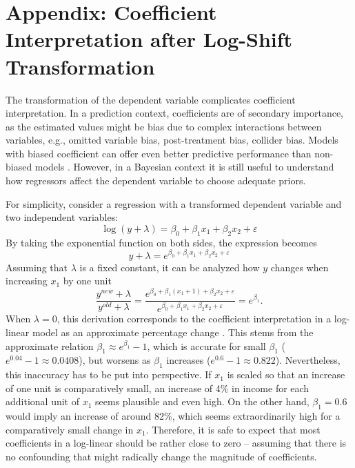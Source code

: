 \chapter{Appendix: Coefficient Interpretation after Log-Shift Transformation}
\label{appendix:coeff}
The transformation of the dependent variable complicates coefficient interpretation.
In a prediction context, coefficients are of secondary importance, as the estimated values might be bias due to complex interactions between variables, e.g., omitted variable bias, post-treatment bias, collider bias.
Models with biased coefficient can offer even better predictive performance than non-biased models \citep[Chapter 7]{mcelreath_statistical_2020}.
However, in a Bayesian context it is still useful to understand how regressors affect the dependent variable to choose adequate priors.

For simplicity, consider a regression with a transformed dependent variable and two independent variables:
\begin{equation*}
    \log(y + \lambda) = \beta_0 + \beta_1 x_1 + \beta_2 x_2 + \varepsilon
\end{equation*}
By taking the exponential function on both sides, the expression becomes
\begin{equation*}
    y + \lambda = e^{\beta_0 + \beta_1 x_1 + \beta_2 x_2 + \varepsilon}
\end{equation*}
Assuming that $\lambda$ is a fixed constant, it can be analyzed how $y$ changes when increasing $x_1$ by one unit
\begin{equation}
    \displaystyle \frac{y^{new} + \lambda}{y^{old} + \lambda} =
    \frac{e^{\beta_0 + \beta_1 (x_1 + 1) + \beta_2 x_2 + \varepsilon}}
    {e^{\beta_0 + \beta_1 x_1 + \beta_2 x_2 + \varepsilon}} = e^{\beta_1}.
\end{equation}
When $\lambda = 0$, this derivation corresponds to the coefficient interpretation in a log-linear model as an approximate percentage change \cite[Chapter 8]{stock_introduction_2015}.
This stems from the approximate relation $\beta_1 \approx e^{\beta_1} - 1$, which is accurate for small $\beta_1$ ($e^{0.04} - 1 \approx 0.0408$), but worsens as $\beta_1$ increases ($e^{0.6} - 1 \approx 0.822$).
Nevertheless, this inaccuracy has to be put into perspective.
If $x_1$ is scaled so that an increase of one unit is comparatively small, an increase of 4\% in income for each additional unit of $x_1$ seems plausible and even high.
On the other hand, $\beta_1 = 0.6$ would imply an increase of around 82\%, which seems extraordinarily high for a comparatively small change in $x_1$.
Therefore, it is safe to expect that most coefficients in a log-linear should be rather close to zero – assuming that there is no confounding that might radically change the magnitude of coefficients.

